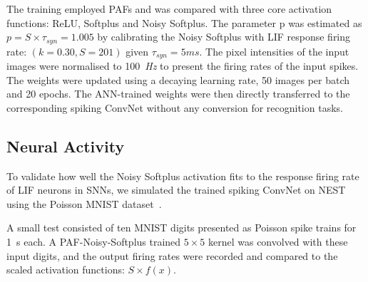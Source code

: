 \documentclass{article}
\begin{document}
	The training employed PAFs and was compared with three core activation functions: ReLU, Softplus and Noisy Softplus.
	The parameter p was estimated as $p = S \times \tau_{syn} = 1.005$ by calibrating the Noisy Softplus with LIF response firing rate: $(k=0.30, S=201)$ given $\tau_{syn}=5 ms$.
	The pixel intensities of the input images were normalised to 100~\textit{Hz} to present the firing rates of the input spikes.
	The weights were updated using a decaying learning rate, 50 images per batch and 20 epochs.
	The ANN-trained weights were then directly transferred to the corresponding spiking ConvNet without any conversion for recognition tasks.
	
	
	\subsection{Neural Activity}
	To validate how well the Noisy Softplus activation fits to the response firing rate of LIF neurons in SNNs, we simulated the trained spiking ConvNet on NEST~\cite{gewaltig2007nest} using the Poisson MNIST dataset~\cite{liu2016bench}.
	
	A small test consisted of ten MNIST digits presented as Poisson spike trains for 1~s each.
	A PAF-Noisy-Softplus trained $5\times5$ kernel was convolved with these input digits, and the output firing rates were recorded and compared to the scaled activation functions: $S \times f(x)$.
	
\end{document}
